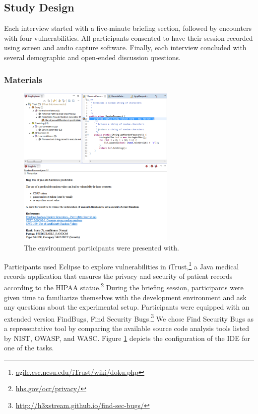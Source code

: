 \documentclass[conference]{IEEEtran}
\begin{document}
\subsection{Study Design}
\label{studyDesign}
Each interview started with a five-minute briefing section, followed by encounters with four vulnerabilities.
All participants consented to have their session recorded using screen and audio capture software.
Finally, each interview concluded with several demographic and open-ended discussion questions.


\subsubsection{Materials}

\begin{figure}
\centering
\includegraphics[width=3in]{Images/environment.png}
\caption{The environment participants were presented with.}
\label{fig:environment} 
\end{figure}
	

Participants used Eclipse to explore vulnerabilities in iTrust,\footnote{\url{agile.csc.ncsu.edu/iTrust/wiki/doku.php}} a Java medical records application that ensures the privacy and security of patient records according to the HIPAA statue.\footnote{\url{hhs.gov/ocr/privacy/}} 
During the briefing session, participants were given time to familiarize themselves with the development environment and ask any questions about the experimental setup.
Participants were equipped with an extended version FindBugs, Find Security Bugs.\footnote{\url{http://h3xstream.github.io/find-sec-bugs/}} 
We chose Find Security Bugs as a representative tool by comparing the available source code analysis tools listed by NIST, OWASP, and WASC.
Figure \ref{fig:environment} depicts the configuration of the IDE for one of the tasks.
\end{document}
